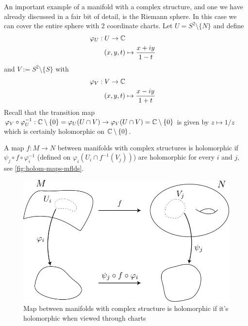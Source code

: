 
\begin{example}
An important example of a manifold with a complex structure, and one we have already discussed in a fair bit of detail, is the Riemann sphere. In this case we can cover the entire sphere with 2 coordinate charts. Let $U = S^2 \setminus \{N\}$ and define
\begin{align*}
    \varphi_U: U \to \mathbb{C}\\
    (x, y, t) &\mapsto \frac{x + iy}{1 - t}
\end{align*} 
and $V := S^2 \setminus \{S\}$ with 
\begin{align*}
    \varphi_V: V \to \mathbb{C}\\
    (x, y, t) &\mapsto \frac{x - iy}{1 + t}
\end{align*}
Recall that the transition map $\varphi_{V} \circ \varphi_U^{-1}: \mathbb{C} \setminus \{0\} = \varphi_U(U \cap V) \to \varphi_V(U \cap V) = \mathbb{C} \setminus \{0\}$ is given by $z \mapsto 1/z$ which is certainly holomorphic on $\mathbb{C} \setminus \{0\}$. 
\end{example}

A map $f: M \to N$ between manifolds with complex structures is holomorphic if $\psi_j \circ f \circ \varphi_i^{-1}$ (defined on $\varphi_i(U_i \cap f^{-1}(V_j))$) are holomorphic for every $i$ and $j$, see \autoref{fig:holom-maps-mflds}.

\begin{figure}[ht]
    \centering
    \includegraphics[scale=0.8]{Images/holom_maps_mflds.png}
    \caption{Map between manifolds with complex structure is holomorphic if it's holomorphic when viewed through charts}
    \label{fig:holom-maps-mflds}
\end{figure}

